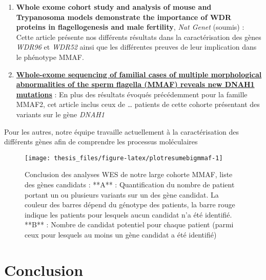 \documentclass[12pt,twoside]{reedthesis}
\theoremstyle{definition}
\theoremstyle{definition}
\theoremstyle{remark}
\begin{document}
  \begin{enumerate}
  \def\labelenumi{\arabic{enumi}.}
  \item
    \textbf{Whole exome cohort study and analysis of mouse and Trypanosoma
    models demonstrate the importance of WDR proteins in flagellogenesis
    and male fertility}, \emph{Nat Genet} (soumis) : Cette article
    présente nos différents résultats dans la caractérisation des gènes
    \emph{WDR96} et \emph{WDR52} ainsi que les différentes preuves de leur
    implication dans le phénotype MMAF.
  \item
    \protect\hyperlink{famdnah1}{\textbf{Whole-exome sequencing of
    familial cases of multiple morphological abnormalities of the sperm
    flagella (MMAF) reveals new DNAH1 mutations}} : En plus des résultats
    évoqués précédemment pour la famille MMAF2, cet article inclus ceux de
    \ldots{} patients de cette cohorte présentant des variants sur le gène
    \emph{DNAH1}
  \end{enumerate}
  
  Pour les autres, notre équipe travaille actuellement à la
  caractérisation des différents gènes afin de comprendre les processus
  moléculaires
  
  \newpage
  
  \begin{figure}
  
  {\centering \texttt{[image: thesis\_files/figure-latex/plotresumebigmmaf-1]} 
  
  }
  
  \caption[Conclusion des analyses WES de notre large cohorte MMAF, liste des gènes candidats]{Conclusion des analyses WES de notre large cohorte MMAF, liste des gènes candidats : **A** : Quantification du nombre de patient portant un ou plusieurs variants sur un des gène candidat. La couleur des barres dépend du génotype des patients, la barre rouge indique les patients pour lesquels aucun candidat n'a été identifié. **B** : Nombre de candidat potentiel pour chaque patient (parmi ceux pour lesquels au moins un gène candidat a été identifié)}\label{fig:plotresumebigmmaf}
  \end{figure}
  
  \newpage
  
  \newpage 
  
  \section{Conclusion}\label{conclusion}
  
\end{document}
